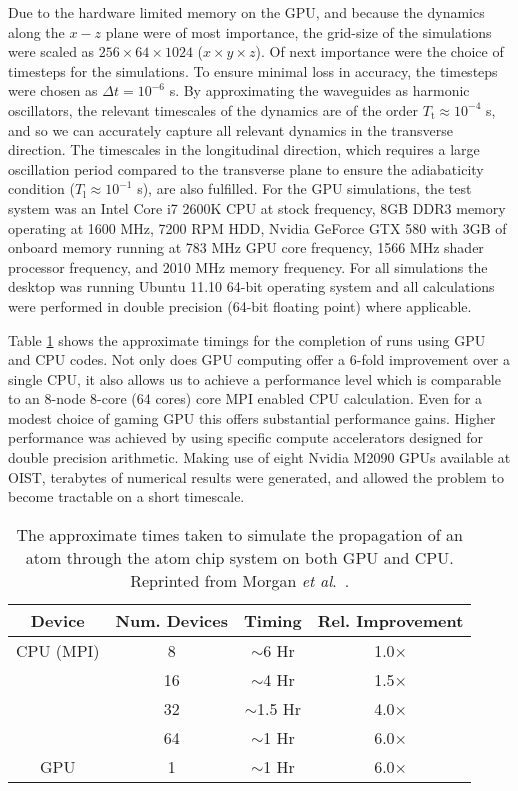 Due to the hardware limited memory on the GPU, and because the dynamics along the $x-z$ plane were of most importance, the grid-size of the simulations were scaled as $256\times 64\times1024$ ($x\times y\times z$). Of next importance were the choice of timesteps for the simulations. To ensure minimal loss in accuracy, the timesteps were chosen as $\Delta t = 10^{-6}$ s. By approximating the waveguides as harmonic oscillators, the relevant timescales of the dynamics are of the order $T_{\textrm{t}}\approx 10^{-4}$ s, and so we can accurately capture all relevant dynamics in the transverse direction. The timescales in the longitudinal direction, which requires a large oscillation period compared to the transverse plane to ensure the adiabaticity condition ($T_{\textrm{l}}\approx 10^{-1}$ s), are also fulfilled. For the GPU simulations, the test system was an Intel Core i7 2600K CPU at stock frequency, 8GB DDR3 memory operating at 1600 MHz, 7200 RPM HDD, Nvidia GeForce GTX 580 with 3GB of onboard memory running at 783 MHz GPU core frequency, 1566 MHz shader processor frequency, and 2010 MHz memory frequency. For all simulations the desktop was running Ubuntu 11.10 64-bit operating system and all calculations were performed in double precision (64-bit floating point) where applicable.

Table \ref{tbl:timing} shows the approximate timings for the completion of runs using GPU and CPU codes. Not only does GPU computing offer a 6-fold improvement over a single CPU, it also allows us to achieve a performance level which is comparable to an 8-node 8-core (64 cores) core MPI enabled CPU calculation. Even for a modest choice of gaming GPU this offers substantial performance gains. Higher performance was achieved by using specific compute accelerators designed for double precision arithmetic. Making use of eight Nvidia M2090 GPUs available at OIST, terabytes of numerical results were generated, and allowed the problem to become tractable on a short timescale.

\begin{table}[tb]
  \begin{center}
    \begin{tabular}{|c||c|c|c|}
      \hline
      Device & Num. Devices & Timing  & Rel. Improvement \\ \hline
      CPU (MPI) & 8 & $\sim$6 Hr & 1.0$\times$ \\
      & 16 & $\sim$4 Hr & 1.5$\times$ \\
      & 32 & $\sim$1.5 Hr & 4.0$\times$ \\
      & 64 & $\sim$1 Hr & 6.0$\times$ \\ \hline
      GPU & 1 & $\sim$1 Hr & 6.0$\times$ \\ \hline
    \end{tabular}
  \end{center}
   \caption{The approximate times taken to simulate the propagation of an atom through the atom chip system on both GPU and CPU. Reprinted from Morgan {\textit{et al}.}~\cite{AO:Morgan_pra_2013}.}
   \label{tbl:timing}
\end{table}
